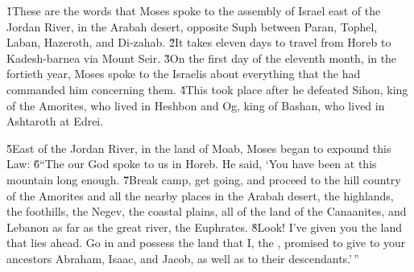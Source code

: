 


\v{1}These are the words that Moses spoke to the assembly of Israel east of the Jordan River, in the Arabah desert, opposite Suph between Paran, Tophel, Laban, Hazeroth, and Di-zahab. \v{2}It takes eleven days to travel from Horeb to Kadesh-barnea via Mount Seir. \v{3}On the first day of the eleventh month, in the fortieth year, Moses spoke to the Israelis about everything that the  had commanded him concerning them. \v{4}This took place after he defeated Sihon, king of the Amorites, who lived in Heshbon and Og, king of Bashan, who lived in Ashtaroth at Edrei.

\v{5}East of the Jordan River, in the land of Moab, Moses began to expound this Law: \v{6}``The  our God spoke to us in Horeb. He said, `You have been at this mountain long enough. \v{7}Break camp, get going, and proceed to the hill country of the Amorites and all the nearby places in the Arabah desert, the highlands, the foothills, the Negev, the coastal plains, all of the land of the Canaanites, and Lebanon as far as the great river, the Euphrates. \v{8}Look! I've given you the land that lies ahead. Go in and possess the land that I, the , promised to give to your ancestors Abraham, Isaac, and Jacob, as well as to their descendants.'\,''

